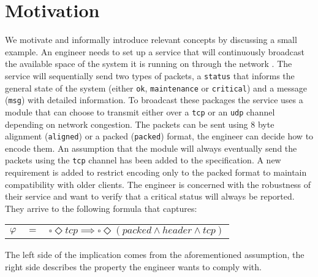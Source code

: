\section{Motivation}\label{sec:motivation}
We motivate and informally introduce relevant concepts by discussing a small example.
An engineer needs to set up a service that will continuously broadcast the available space of the system it is running on through the network . The service will sequentially send two types of packets, a \texttt{status} that informs the general state of the system (either \texttt{ok}, \texttt{maintenance} or \texttt{critical}) and a message (\texttt{msg}) with detailed information. To broadcast these packages the service uses a module that can choose to transmit either over a \texttt{tcp} or an \texttt{udp} channel depending on network congestion. The packets can be sent using 8 byte alignment (\texttt{aligned}) or a packed (\texttt{packed}) format, the engineer can decide how to encode them. 
An assumption that the module will always eventually send the packets using the \texttt{tcp} channel has been added to the specification. A new requirement is added to restrict encoding only to the packed format to maintain compatibility with older clients. The engineer is concerned with the robustness of their service and want to verify that a critical status will always be reported. They arrive to the following formula that captures:

\begin{center}
	\begin{tabular}{ r c l }
		$\varphi$& $=$ &$\square \Diamond tcp\implies\square \Diamond (packed \wedge header \wedge tcp)$\\
	\end{tabular}
\end{center} 
The left side of the implication comes from the aforementioned assumption, the right side describes the property the engineer wants to comply with.

